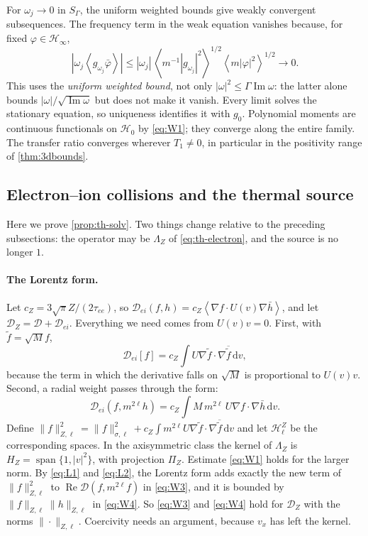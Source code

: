 \documentclass[11pt]{article}
\newcommand{\dd}{\,\mathrm d}
\newcommand{\av}[1]{\left\langle #1\right\rangle}
\newcommand{\D}{\mathcal D}
\newcommand{\HH}{\mathcal H}
\newcommand{\Real}{\operatorname{Re}}
\newcommand{\Imag}{\operatorname{Im}}
\theoremstyle{definition}
\theoremstyle{remark}
\numberwithin{equation}{section}
\begin{document}
For $\omega_j\to0$ in $S_\Gamma$, the uniform weighted bounds give
weakly convergent subsequences. The frequency term in the weak
equation vanishes because, for fixed $\varphi\in\HH_\infty$,
\[
 |\omega_j\av{g_{\omega_j}\bar\varphi}|
 \leq |\omega_j|\,
       \av{m^{-1}|g_{\omega_j}|^2}^{1/2}
       \av{m|\varphi|^2}^{1/2}
 \longrightarrow0.
\]
This uses the \emph{uniform weighted bound}, not only
$|\omega|^2\leq\Gamma\Imag\omega$: the latter alone bounds
$|\omega|/\sqrt{\Imag\omega}$ but does not make it vanish.
Every limit solves the stationary equation, so uniqueness identifies
it with $g_0$. Polynomial moments are continuous functionals on
$\HH_0$ by \eqref{eq:W1}; they converge along the entire family.
The transfer ratio converges wherever $T_1\ne0$, in particular in
the positivity range of \cref{thm:3dbounds}.

\subsection{Electron--ion collisions and the thermal source}\label{app:th-solv}

Here we prove \cref{prop:th-solv}. Two things change relative to the
preceding subsections: the operator may be $\Lambda_Z$ of
\eqref{eq:th-electron}, and the source is no longer $1$.

\paragraph{The Lorentz form.}
Let $c_Z=3\sqrt\pi Z/(2\tau_{ee})$, so
$\D_{ei}(f,h)=c_Z\av{\nabla f\cdot U(v)\nabla\bar h}$, and let $\D_Z=\D+\D_{ei}$.
Everything we need comes from $U(v)v=0$. First, with
$\widetilde f=\sqrt Mf$,
\begin{equation}
 \D_{ei}[f]=c_Z\int U\nabla\widetilde f\cdot\nabla\overline{\widetilde f}\dd v ,
 \label{eq:L1}
\end{equation}
because the term in which the derivative falls on $\sqrt M$ is
proportional to $U(v)v$. Second, a radial weight passes through the form:
\begin{equation}
 \D_{ei}(f,m^{2\ell}h)=c_Z\int M\,m^{2\ell}\,U\nabla f\cdot\nabla\bar h\dd v .
 \label{eq:L2}
\end{equation}
Define $\|f\|_{Z,\ell}^2=\|f\|_{\sigma,\ell}^2
+c_Z\int m^{2\ell}U\nabla\widetilde f\cdot\nabla\overline{\widetilde f}\dd v$ and let
$\HH_\ell^Z$ be the corresponding spaces. In the axisymmetric class the
kernel of $\Lambda_Z$ is $H_Z=\operatorname{span}\{1,|v|^2\}$, with
projection $\Pi_Z$. Estimate \eqref{eq:W1} holds for the larger norm. By
\eqref{eq:L1} and \eqref{eq:L2}, the Lorentz form adds exactly the new
term of $\|f\|_{Z,\ell}^2$ to $\Real\D(f,m^{2\ell}f)$ in \eqref{eq:W3}, and it is
bounded by $\|f\|_{Z,\ell}\|h\|_{Z,\ell}$ in \eqref{eq:W4}. So
\eqref{eq:W3} and \eqref{eq:W4} hold for $\D_Z$ with the norms
$\|\cdot\|_{Z,\ell}$. Coercivity needs an argument, because $v_x$ has left
the kernel.
\end{document}
